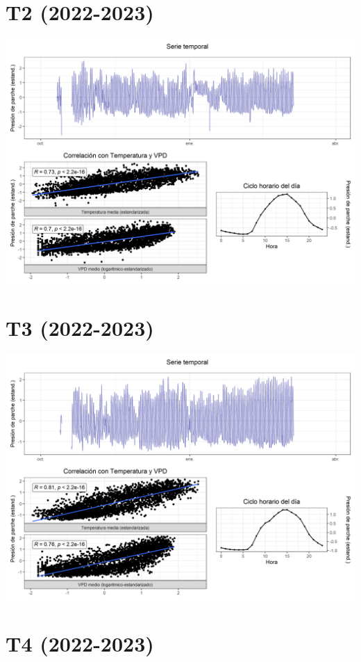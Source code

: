 \documentclass[
  letterpaper,
  DIV=11,
  numbers=noendperiod]{scrreprt}
\begin{document}
\chapter{T2 (2022-2023)}

\includegraphics{figuras/05_turgor_tratamiento/2022_2023_La_Esperanza_T2.png}

\chapter{T3 (2022-2023)}

\includegraphics{figuras/05_turgor_tratamiento/2022_2023_La_Esperanza_T3.png}

\chapter{T4 (2022-2023)}
\end{document}
